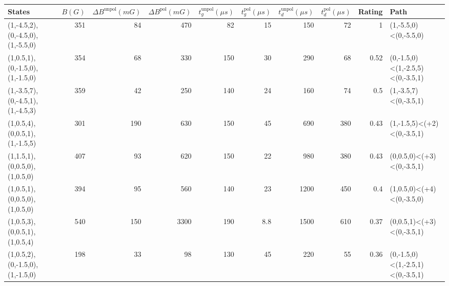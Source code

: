 \begin{tabular}{lrrrrrrrrl}
\hline
 {States}                         &   {$B(G)$} &   {$\Delta B^{\text{unpol}}(mG)$} &   {$\Delta B^{\text{pol}}(mG)$} &   {$t^{\text{unpol}}_{g}(\mu s)$} &   {$t^{\text{pol}}_{g}(\mu s)$} &   {$t^{\text{unpol}}_{d}(\mu s)$} &   {$t^{\text{pol}}_{d}(\mu s)$} &   {Rating} & {Path}                           \\
\hline
 (1,-4.5,2),(0,-4.5,0),(1,-5.5,0) &        351 &                                84 &                             470 &                                82 &                            15   &                               150 &                              72 &       1    & (1,-5.5,0)<(0,-5.5,0)            \\
 (1,0.5,1),(0,-1.5,0),(1,-1.5,0)  &        354 &                                68 &                             330 &                               150 &                            30   &                               290 &                              68 &       0.52 & (0,-1.5,0)<(1,-2.5,5)<(0,-3.5,1) \\
 (1,-3.5,7),(0,-4.5,1),(1,-4.5,3) &        359 &                                42 &                             250 &                               140 &                            24   &                               160 &                              74 &       0.5  & (1,-3.5,7)<(0,-3.5,1)            \\
 (1,0.5,4),(0,0.5,1),(1,-1.5,5)   &        301 &                               190 &                             630 &                               150 &                            45   &                               690 &                             380 &       0.43 & (1,-1.5,5)<(+2)<(0,-3.5,1)       \\
 (1,1.5,1),(0,0.5,0),(1,0.5,0)    &        407 &                                93 &                             620 &                               150 &                            22   &                               980 &                             380 &       0.43 & (0,0.5,0)<(+3)<(0,-3.5,1)        \\
 (1,0.5,1),(0,0.5,0),(1,0.5,0)    &        394 &                                95 &                             560 &                               140 &                            23   &                              1200 &                             450 &       0.4  & (1,0.5,0)<(+4)<(0,-3.5,0)        \\
 (1,0.5,3),(0,0.5,1),(1,0.5,4)    &        540 &                               150 &                            3300 &                               190 &                             8.8 &                              1500 &                             610 &       0.37 & (0,0.5,1)<(+3)<(0,-3.5,1)        \\
 (1,0.5,2),(0,-1.5,0),(1,-1.5,0)  &        198 &                                33 &                              98 &                               130 &                            45   &                               220 &                              55 &       0.36 & (0,-1.5,0)<(1,-2.5,1)<(0,-3.5,1) \\
\hline
\end{tabular}
